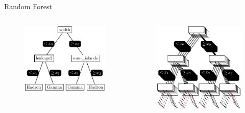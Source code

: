 \documentclass[aspectratio=1610, professionalfonts, 9pt]{beamer}
\begin{document}
\begin{frame}{Random Forest}
  \begin{columns}
	\begin{figure}
	  \centering
	  \includegraphics[scale=1]{./tikz/Tree/Tree.pdf}
	\end{figure}
	\begin{figure}
	  \centering
	  \includegraphics[scale=1]{./tikz/RandomForest/RandomForest.pdf}
	\end{figure}
  \end{columns}
\end{frame}
\end{document}
